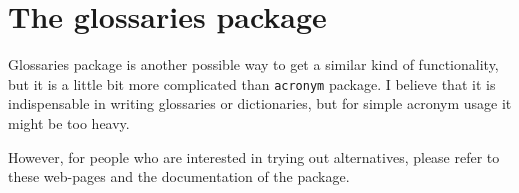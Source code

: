 \section{The glossaries package}

Glossaries package is another possible way to get a similar kind of
functionality, but it is a little bit more complicated than \verb|acronym|
package. I believe that it is indispensable in writing glossaries or
dictionaries, but for simple acronym usage it might be too heavy.

However, for people who are interested in trying out alternatives, please refer
to these web-pages and the documentation of the package.



